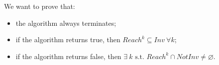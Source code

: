 \documentclass[12pt]{article}
\begin{document}
    We want to prove that:
    \begin{itemize}
        \item the algorithm always terminates;
        \item if the algorithm returns true, then $Reach^k \subseteq Inv\ \forall k$;
        \item if the algorithm returns false, then $\exists\ k \mbox{ s.t. } Reach^k \cap NotInv \neq \varnothing$.
    \end{itemize}




\end{document}
